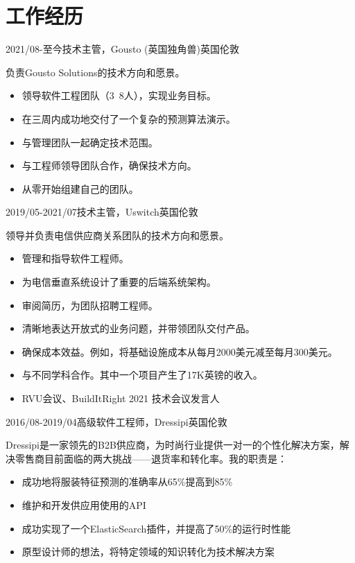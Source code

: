 \documentclass[a4paper]{twentysecondcv-chinese} %
\begin{document}
\section{工作经历}

\begin{twenty} %
	\twentyitem
	    {2021/08-至今}{技术主管，Gousto (英国独角兽)}{英国伦敦}
    	{负责Gousto Solutions的技术方向和愿景。
        	\begin{itemize}
        	    \item 领导软件工程团队（3~8人），实现业务目标。
        	    \item 在三周内成功地交付了一个复杂的预测算法演示。
              \item 与管理团队一起确定技术范围。
              \item 与工程师领导团队合作，确保技术方向。
              \item 从零开始组建自己的团队。
            \end{itemize}}
	\twentyitem
	    {2019/05-2021/07}{技术主管，Uswitch}{英国伦敦}
    	{领导并负责电信供应商关系团队的技术方向和愿景。
        	\begin{itemize}
              \item 管理和指导软件工程师。
              \item 为电信垂直系统设计了重要的后端系统架构。
              \item 审阅简历，为团队招聘工程师。
              \item 清晰地表达开放式的业务问题，并带领团队交付产品。
              \item 确保成本效益。例如，将基础设施成本从每月2000美元减至每月300美元。
              \item 与不同学科合作。其中一个项目产生了17K英镑的收入。
              \item RVU会议、BuildItRight 2021 技术会议发言人
            \end{itemize}}
	\twentyitem
	    {2016/08-2019/04}{高级软件工程师，Dressipi}{英国伦敦}
    	{Dressipi是一家领先的B2B供应商，为时尚行业提供一对一的个性化解决方案，解决零售商目前面临的两大挑战——退货率和转化率。我的职责是：
        	\begin{itemize}
              \item 成功地将服装特征预测的准确率从65\%提高到85\%
              \item 维护和开发供应用使用的API
              \item 成功实现了一个ElasticSearch插件，并提高了50\%的运行时性能
              \item 原型设计师的想法，将特定领域的知识转化为技术解决方案

\end{itemize}}
\end{twenty}
\end{document}

